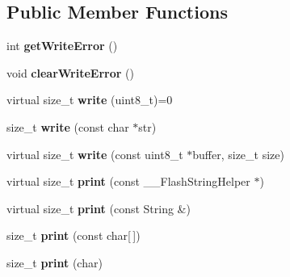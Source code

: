 \subsection*{Public Member Functions}
\begin{DoxyCompactItemize}
\item 
\hypertarget{class_print_a88a4a829fb5d589efb43955ad0cbddcc}{}int {\bfseries get\+Write\+Error} ()\label{class_print_a88a4a829fb5d589efb43955ad0cbddcc}

\item 
\hypertarget{class_print_aec9ecf84cc6d9087a650def3cefc459e}{}void {\bfseries clear\+Write\+Error} ()\label{class_print_aec9ecf84cc6d9087a650def3cefc459e}

\item 
\hypertarget{class_print_a5be30d49adae2406a270c29ba9a3e0a3}{}virtual size\+\_\+t {\bfseries write} (uint8\+\_\+t)=0\label{class_print_a5be30d49adae2406a270c29ba9a3e0a3}

\item 
\hypertarget{class_print_a5b40e0e9cab1f2fe5bb0cb22ffe5adda}{}size\+\_\+t {\bfseries write} (const char $\ast$str)\label{class_print_a5b40e0e9cab1f2fe5bb0cb22ffe5adda}

\item 
\hypertarget{class_print_ad98d820df11e2697be1e4b1ea30b4a23}{}virtual size\+\_\+t {\bfseries write} (const uint8\+\_\+t $\ast$buffer, size\+\_\+t size)\label{class_print_ad98d820df11e2697be1e4b1ea30b4a23}

\item 
\hypertarget{class_print_aa4158dd94bc1741f92d99c427261d7c0}{}virtual size\+\_\+t {\bfseries print} (const \+\_\+\+\_\+\+Flash\+String\+Helper $\ast$)\label{class_print_aa4158dd94bc1741f92d99c427261d7c0}

\item 
\hypertarget{class_print_a157007ca7ea8334ba7eb4bc705740216}{}virtual size\+\_\+t {\bfseries print} (const String \&)\label{class_print_a157007ca7ea8334ba7eb4bc705740216}

\item 
\hypertarget{class_print_acfe80773011eb17dfb52c2fba517a093}{}size\+\_\+t {\bfseries print} (const char\mbox{[}$\,$\mbox{]})\label{class_print_acfe80773011eb17dfb52c2fba517a093}

\item 
\hypertarget{class_print_a1e411d07a8ffec5faf7ce485bac0f029}{}size\+\_\+t {\bfseries print} (char)\label{class_print_a1e411d07a8ffec5faf7ce485bac0f029}


\end{DoxyCompactItemize}
